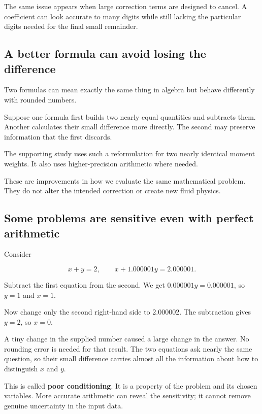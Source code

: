 \documentclass[
  english,
  11pt,
]{article}
\begin{document}
The same issue appears when large correction terms are designed to
cancel. A coefficient can look accurate to many digits while still
lacking the particular digits needed for the final small remainder.

\subsection{A better formula can avoid losing the
difference}\label{a-better-formula-can-avoid-losing-the-difference}

Two formulas can mean exactly the same thing in algebra but behave
differently with rounded numbers.

Suppose one formula first builds two nearly equal quantities and
subtracts them. Another calculates their small difference more directly.
The second may preserve information that the first discards.

The supporting study uses such a reformulation for two nearly identical
moment weights. It also uses higher-precision arithmetic where needed.

These are improvements in how we evaluate the same mathematical problem.
They do not alter the intended correction or create new fluid physics.

\subsection{Some problems are sensitive even with perfect
arithmetic}\label{some-problems-are-sensitive-even-with-perfect-arithmetic}

Consider

\[
x+y=2,\qquad x+1.000001y=2.000001.
\]

Subtract the first equation from the second. We get
\(0.000001y=0.000001\), so \(y=1\) and \(x=1\).

Now change only the second right-hand side to 2.000002. The subtraction
gives \(y=2\), so \(x=0\).

A tiny change in the supplied number caused a large change in the
answer. No rounding error is needed for that result. The two equations
ask nearly the same question, so their small difference carries almost
all the information about how to distinguish \(x\) and \(y\).

This is called \textbf{poor conditioning}. It is a property of the
problem and its chosen variables. More accurate arithmetic can reveal
the sensitivity; it cannot remove genuine uncertainty in the input data.
\end{document}
